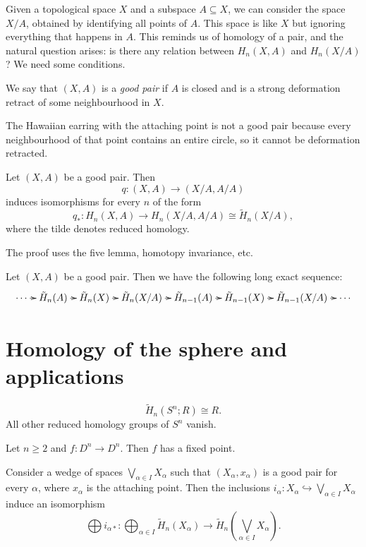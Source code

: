 Given a topological space $X$ and a subspace
$A\subseteq X$,
we can consider the space $X/A$, obtained by
identifying all
points of $A$. This space is like $X$ but
ignoring everything
that happens in $A$. This reminds us of
homology of a pair,
and the natural question arises: is there any
relation
between $H_n(X,A)$ and $H_n(X/A)$? We need
some conditions.

\begin{definition}
We say that $(X,A)$ is a \emph{good pair} if
$A$ is closed
and is a strong deformation retract of some
neighbourhood in
$X$.
\end{definition}

The Hawaiian earring with the attaching point
is not a good
pair because every neighbourhood of that
point contains an
entire circle, so it cannot be deformation
retracted.

\begin{theorem}
Let $(X,A)$ be a good pair. Then
$$
q:(X,A)\to(X/A,A/A)
$$
induces isomorphisms for every $n$ of the
form
$$
q_*:H_n(X,A)\to H_n(X/A,A/A)
\cong\tilde H_n(X/A),
$$
where the tilde denotes reduced homology.
\end{theorem}

The proof uses the five lemma, homotopy
invariance, etc.

\begin{corollary}
Let $(X,A)$ be a good pair. Then we have the
following long
exact sequence:
$$
\xymatrix@C=.6em{
\cdots \ar[r]
 & \tilde H_n(A) \ar[r]
 & \tilde H_n(X) \ar[r]
 & \tilde H_n(X/A) \ar[r]
 & \tilde H_{n-1}(A) \ar[r]
 & \tilde H_{n-1}(X) \ar[r]
 & \tilde H_{n-1}(X/A) \ar[r]
 & \cdots
}
$$
\end{corollary}
\section{Homology of the sphere and
applications}
\label{section-sphere-homology-applications}

\begin{theorem}
$$
\tilde H_n(S^n;R)\cong R.
$$
All other reduced homology groups of $S^n$
vanish.
\end{theorem}

\begin{theorem}
Let $n\geq2$ and $f:D^n\to D^n$. Then $f$ has
a fixed point.
\end{theorem}

\begin{theorem}
Consider a wedge of spaces
$\bigvee_{\alpha\in I}X_\alpha$
such that $(X_\alpha,x_\alpha)$ is a good
pair for every
$\alpha$, where $x_\alpha$ is the attaching
point. Then the
inclusions $i_\alpha:X_\alpha\hookrightarrow
\bigvee_{\alpha\in I}X_\alpha$ induce an
isomorphism
$$
\bigoplus i_{\alpha *}:
\bigoplus_{\alpha\in I}\tilde H_n(X_\alpha)
\to
\tilde H_n\left(
\bigvee_{\alpha\in I}X_\alpha
\right).
$$
\end{theorem}

